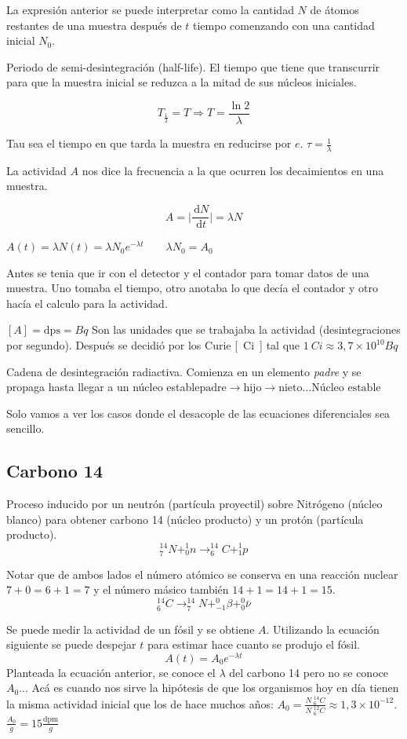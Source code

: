 \documentclass[10pt,twocolumn,titlepage]{article}
\newcommand{\di}{\,\textrm{d}}
\begin{document}
La expresión anterior se puede interpretar como la cantidad $N$ de átomos restantes de una muestra después de $t$ tiempo comenzando con una cantidad inicial $N_0$.

Periodo de semi-desintegración (half-life). El tiempo que tiene que transcurrir para que la muestra inicial se reduzca a la mitad de sus núcleos iniciales.

$$T_\frac{1}{2}=T\Rightarrow T=\frac{\ln2}{\lambda} $$

Tau sea el tiempo en que tarda la muestra en reducirse por $e$. $\tau=\frac{1}{\lambda}$

La actividad $A$ nos dice la frecuencia a la que ocurren los decaimientos en una muestra.

$$A=\bigg| \frac{\di N}{\di t}\bigg|=\lambda N$$

$A(t)=\lambda N(t)=\lambda N_0e^{-\lambda t}\qquad \lambda N_0=A_0$

Antes se tenia que ir con el detector y el contador para tomar datos de una muestra. Uno tomaba el tiempo, otro anotaba lo que decía el contador y otro hacía el calculo para la actividad.

$[A]=\textrm{dps}=\si{Bq}$ Son las unidades que se trabajaba la actividad (desintegraciones por segundo). Después se decidió por los Curie \si{[Ci]} tal que $\SI{1}{Ci}\approx 3,7\times 10^{10}\si{Bq}$

Cadena de desintegración radiactiva. Comienza en un elemento \emph{padre} y se propaga hasta llegar a un núcleo estable$\textrm{padre}\rightarrow\textrm{hijo}\rightarrow\textrm{nieto}\ldots \textrm{Núcleo estable}$

Solo vamos a ver los casos donde el desacople de las ecuaciones diferenciales sea sencillo.

\subsection{Carbono 14}
Proceso inducido por un neutrón (partícula proyectil) sobre Nitrógeno (núcleo blanco)  para obtener carbono 14 (núcleo producto) y un protón (partícula producto).
$$^{14}_7N+^1_0n\rightarrow ^{14}_6C+^1_1p $$

Notar que de ambos lados el número atómico se conserva en una reacción nuclear $7+0=6+1=7$ y el número másico también $14+1=14+1=15$.
$$^{14}_6C\rightarrow ^{14}_7N+^0_{-1}\beta+^0_ 0 \bar{\nu}$$



Se puede medir la actividad de un fósil y se obtiene $A$. Utilizando la ecuación siguiente se puede despejar $t$ para estimar hace cuanto se produjo el fósil.
$$A(t)=A_0e^{-\lambda t} $$
Planteada la ecuación anterior, se conoce el $\lambda$ del carbono 14 pero no se conoce $A_0$... Acá es cuando nos sirve la hipótesis de que los organismos hoy en día tienen la misma actividad inicial que los de hace muchos años: $A_0=\frac{N\;^{14}_6C}{N\;^{12}_6C }\approx 1,3\times 10^{-12} $. $\frac{A_0}{g}=15\frac{\textrm{dpm}}{g}$
\end{document}
